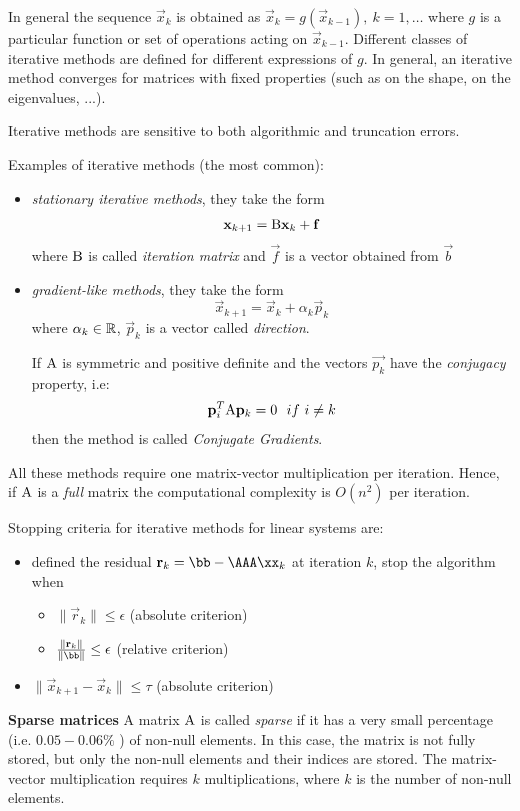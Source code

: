 In general the sequence $\vec{x}_k$ is obtained as $\vec{x}_k=g(\vec{x}_{k-1}), \ k=1,\ldots$ where $g$ is a particular function or set of operations acting on $\vec{x}_{k-1}$.
Different classes of iterative methods are defined for different expressions of $g$.
In general, an iterative method converges for matrices with fixed properties (such as on the shape, on the eigenvalues, ...).

Iterative methods are sensitive to both algorithmic and truncation errors.

Examples of iterative methods (the most common):

\begin{itemize}
    \item \textit{stationary iterative methods}, they take the form
    $$\mathbf{x}_{k+1} = \mathrm{B}\mathbf{x}_k + \mathbf{f}$$
    where $\mathrm{B}$ is called \textit{iteration matrix} and $\vec{f}$ is a vector obtained from $\vec{b}$
    \item \textit{gradient-like methods}, they take the form
    $$\vec{x}_{k+1} = \vec{x}_k + \alpha_k\vec{p}_k$$
    where $\alpha_k \in \mathbb{R}$, $\vec{p}_k$ is a vector called \textit{direction}.
    
    If $\mathrm{A}$ is symmetric and positive definite and the vectors $\vec{p_k}$ have the \textit{conjugacy} property, i.e:
    $$\mathbf{p}_i^T\mathrm{A}\mathbf{p}_k=0 \ \ if \ i \neq k $$
    then the method is called \textit{Conjugate Gradients}.
\end{itemize}

All these methods require one matrix-vector multiplication per iteration. Hence, if $\mathrm{A}$ is a \textit{full} matrix the computational complexity is $O(n^2)$  per iteration.

Stopping criteria for iterative methods for linear systems are:
\begin{itemize}
\item defined the residual $\vec{r}_k=\bb-\AAA\xx_k$ at iteration $k$, stop the algorithm when
\begin{itemize}
   \item $\|\vec{r}_k\| \le \epsilon$ (absolute criterion)
    \item $\frac{\|\vec{r}_k\|}{\|\bb\|} \le \epsilon$ (relative criterion)
    \end{itemize}
    \item $\|\vec{x}_{k+1}-\vec{x}_k\| \le \tau$ (absolute criterion)
\end{itemize}

\textbf{Sparse matrices}
A matrix $\mathrm{A}$ is called \textit{sparse} if it has a very small percentage (i.e. $0.05-0.06 \%$ ) of non-null elements. In this case, the matrix is not fully stored, but only the non-null elements and their indices are stored. The matrix-vector multiplication requires $k$ multiplications, where $k$ is the number of non-null elements.


